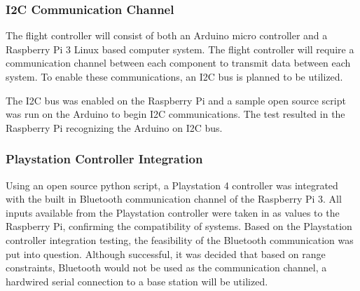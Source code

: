   
  \subsubsection{I2C Communication Channel}
  
  The flight controller will consist of both an Arduino micro controller and a Raspberry Pi 3 Linux based computer system. The flight controller will require a communication channel between each component to transmit data between each system. To enable these communications, an I2C bus is planned to be utilized.
  
  The I2C bus was enabled on the Raspberry Pi and a sample open source script was run on the Arduino to begin I2C communications. The test resulted in the Raspberry Pi recognizing the Arduino on I2C bus.
  
  
  \subsubsection{Playstation Controller Integration}
  
  Using an open source python script, a Playstation 4 controller was integrated with the built in Bluetooth communication channel of the Raspberry Pi 3. All inputs available from the Playstation controller were taken in as values to the Raspberry Pi, confirming the compatibility of systems. Based on the Playstation controller integration testing, the feasibility of the Bluetooth communication was put into question. Although successful, it was decided that based on range constraints, Bluetooth would not be used as the communication channel, a hardwired serial connection to a base station will be utilized. 
